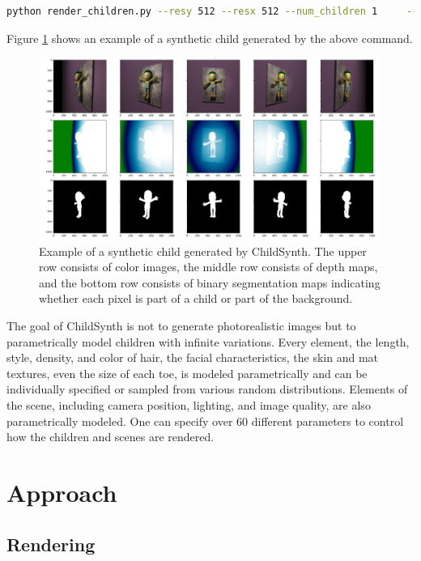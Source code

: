 \documentclass{article}
\begin{document}
\begin{lstlisting}[language=bash]
python render_children.py --resy 512 --resx 512 --num_children 1     --output_dir ./output 
\end{lstlisting}

Figure \ref{fig:child_0} shows an example of a synthetic child generated by the above command.

\begin{figure}[]
    \centering
    \includegraphics[width=\textwidth]{plots/child_0.png}
    \caption{Example of a synthetic child generated by ChildSynth. The upper row consists of color images, the middle row consists of depth maps, and the bottom row consists of binary segmentation maps indicating whether each pixel is part of a child or part of the background.}
    \label{fig:child_0}
\end{figure}

The goal of ChildSynth is not to generate photorealistic images but to parametrically model children with infinite variations. Every element, the length, style, density, and color of hair, the facial characteristics, the skin and mat textures, even the size of each toe, is modeled parametrically and can be individually specified or sampled from various random distributions. Elements of the scene, including camera position, lighting, and image quality, are also parametrically modeled. One can specify over $60$ different parameters to control how the children and scenes are rendered.

\section{Approach}
\subsection{Rendering}
\end{document}
